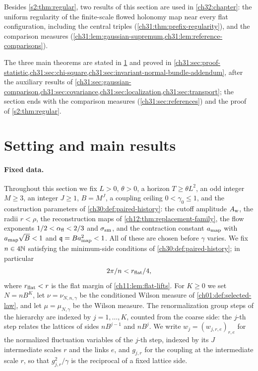Besides \cref{s2:thm:regular}, two results of this section are used in \cref{ch32:chapter}: the uniform regularity of the finite-scale flowed holonomy map near every flat configuration, including the central triples (\cref{ch31:thm:prefix-regularity}), and the comparison measures (\cref{ch31:lem:gaussian-supremum,ch31:lem:reference-comparisons}).

The three main theorems are stated in \cref{ch31:sec:results} and proved in \cref{ch31:sec:proof-statistic,ch31:sec:chi-square,ch31:sec:invariant-normal-bundle-addendum}, after the auxiliary results of \cref{ch31:sec:gaussian-comparison,ch31:sec:covariance,ch31:sec:localization,ch31:sec:transport}; the section ends with the comparison measures (\cref{ch31:sec:references}) and the proof of \cref{s2:thm:regular}.

\section{Setting and main results}\label{ch31:sec:results}

\paragraph{Fixed data.}
Throughout this section we fix $L>0$, $\theta>0$, a horizon $T\ge\theta L^2$, an odd integer $M\ge3$, an integer $J\ge1$, $B=M^J$, a coupling ceiling $0<\gamma_0\le1$, and the construction parameters of \cref{ch30:def:paired-history}: the cutoff amplitude $A_{\rm w}$, the radii $r<\rho$, the reconstruction maps of \cref{ch12:thm:replacement-family}, the flow exponents $1/2<\alpha_{\mathrm{fl}}<2/3$ and $\sigma_{\rm sm}$, and the contraction constant $a_{\rm map}$ with $a_{\rm map}\sqrt B<1$ and $\mathfrak q=Ba_{\rm map}^2<1$. All of these are chosen before $\gamma$ varies. We fix $n\in4\mathbb N$ satisfying the minimum-side conditions of \cref{ch30:def:paired-history}; in particular
\[
 2\pi/n<r_{\rm flat}/4,
\]
where $r_{\rm flat}<r$ is the flat margin of \cref{ch11:lem:flat-lifts}. For $K\ge0$ we set $N=nB^K$, let $\nu=\nu_{N,n,\gamma}$ be the conditioned Wilson measure of \cref{ch01:def:selected-law}, and let $\mu=\mu_{N,\gamma}$ be the Wilson measure. The renormalization group steps of the hierarchy are indexed by $j=1,\dots,K$, counted from the coarse side: the $j$-th step relates the lattices of sides $nB^{j-1}$ and $nB^j$. We write $w_j=(w_{j,r,e})_{r,e}$ for the normalized fluctuation variables of the $j$-th step, indexed by its $J$ intermediate scales $r$ and the links $e$, and $g_{j,r}$ for the coupling at the intermediate scale $r$, so that $g_{j,r}^2/\gamma$ is the reciprocal of a fixed lattice side.

